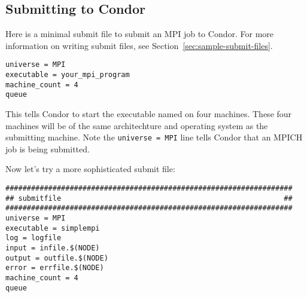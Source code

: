 \subsection{\label{sec:MPI-submit}Submitting to Condor}

Here is a minimal submit file to submit an MPI job to Condor.  For more 
information on writing submit files, see Section~\ref{sec:sample-submit-files}.

\begin{verbatim}
universe = MPI
executable = your_mpi_program
machine_count = 4
queue 
\end{verbatim}

This tells Condor to start the executable named 
on four machines.  These four machines will be of the same architechture
and operating system as the submitting machine.  Note the 
\verb+universe = MPI+ line tells Condor that an MPICH job is being submitted.  

Now let's try a more sophisticated submit file:
\begin{verbatim}
###################################################################
## submitfile                                                    ##
###################################################################
universe = MPI
executable = simplempi
log = logfile
input = infile.$(NODE)
output = outfile.$(NODE)
error = errfile.$(NODE)
machine_count = 4
queue
\end{verbatim}


